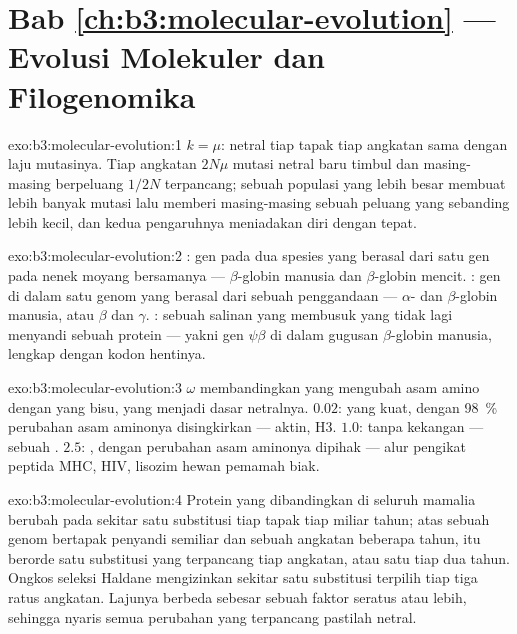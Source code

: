 \section*{Bab \ref{ch:b3:molecular-evolution} --- Evolusi Molekuler dan Filogenomika}

\begin{solution}{exo:b3:molecular-evolution:1}
$k = \mu$:  netral tiap tapak tiap angkatan sama dengan
laju mutasinya. Tiap angkatan $2N\mu$ mutasi netral baru timbul
dan masing-masing berpeluang $1/2N$ terpancang; sebuah populasi yang lebih besar membuat
lebih banyak mutasi lalu memberi masing-masing sebuah peluang yang sebanding lebih kecil, dan
kedua pengaruhnya meniadakan diri dengan tepat.
\end{solution}

\begin{solution}{exo:b3:molecular-evolution:2}
: gen pada dua spesies yang berasal dari satu gen pada nenek
moyang bersamanya --- $\beta$-globin manusia dan $\beta$-globin mencit.
: gen di dalam satu genom yang berasal dari sebuah penggandaan ---
$\alpha$- dan $\beta$-globin manusia, atau $\beta$ dan $\gamma$. : sebuah
salinan yang membusuk yang tidak lagi menyandi sebuah protein --- yakni gen $\psi\beta$
di dalam gugusan $\beta$-globin manusia, lengkap dengan kodon hentinya.
\end{solution}

\begin{solution}{exo:b3:molecular-evolution:3}
$\omega$ membandingkan  yang mengubah asam amino dengan
 yang bisu, yang menjadi dasar netralnya. $0.02$:
 yang kuat, dengan \qty{98}{\%} perubahan asam aminonya disingkirkan
--- aktin,  H3. $1.0$: tanpa kekangan --- sebuah . $2.5$:
, dengan perubahan asam aminonya dipihak --- alur pengikat
peptida MHC,  HIV, lisozim hewan pemamah biak.
\end{solution}

\begin{solution}{exo:b3:molecular-evolution:4}
Protein yang dibandingkan di seluruh mamalia berubah pada sekitar satu substitusi tiap
tapak tiap miliar tahun; atas sebuah genom bertapak penyandi semiliar dan sebuah
angkatan beberapa tahun, itu berorde satu substitusi yang
terpancang tiap angkatan, atau satu tiap dua tahun. Ongkos seleksi
Haldane mengizinkan sekitar satu substitusi terpilih tiap tiga ratus
angkatan. Lajunya berbeda sebesar sebuah faktor seratus atau lebih, sehingga
nyaris semua perubahan yang terpancang pastilah netral.
\end{solution}

